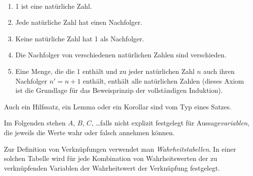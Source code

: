\begin{example}~
\begin{enumerate}
\item 1 ist eine natürliche Zahl.
\item Jede natürliche Zahl hat einen Nachfolger.
\item Keine natürliche Zahl hat 1 als Nachfolger.
\item Die Nachfolger von verschiedenen natürlichen Zahlen sind verschieden.
\item Eine Menge, die die 1 enthält und zu jeder natürlichen Zahl $n$ auch ihren Nachfolger $n' = n + 1$ enthält, enthält alle natürlichen Zahlen (dieses Axiom ist die Grundlage für das Beweisprinzip der vollständigen Induktion).
\end{enumerate}
\end{example}

\begin{note}
Auch ein Hilfssatz, ein Lemma oder ein Korollar sind vom Typ eines Satzes.
\end{note}

Im Folgenden stehen $A$, $B$, $C$, \dots falls nicht explizit festgelegt für Aussage\emph{variablen}, die jeweils die Werte wahr oder falsch annehmen können.

Zur Definition von Verknüpfungen verwendet man \emph{Wahrheitstabellen}. In einer solchen Tabelle wird für jede Kombination von Wahrheitswerten der zu verknüpfenden Variablen der Wahrheitswert der Verknüpfung festgelegt.

